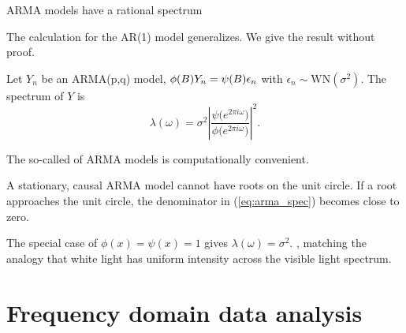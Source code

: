 \begin{frame}{ARMA models have a rational spectrum}
\bi
\item The calculation for the AR(1) model generalizes. We give the result without proof.
\item Let $Y_n$ be an ARMA(p,q) model, $\phi(B)Y_n = \psi(B)\epsilon_n$ with $\epsilon_n\sim \mathrm{WN}(\sigma^2)$. The spectrum of $Y$ is
\begin{equation} \label{eq:arma_spec}
\lambda(\omega) = \sigma^2 \left| \frac{\psi\big( e^{2\pi i \omega} \big)}{\phi\big( e^{2\pi i \omega} \big)} \right|^2.
\end{equation}
\item The so-called  of ARMA models is computationally convenient.
\item A stationary, causal ARMA model cannot have roots on the unit circle. If a root approaches the unit circle, the denominator in (\ref{eq:arma_spec}) becomes close to zero.
\item The special case of $\phi(x)=\psi(x)=1$ gives $\lambda(\omega)=\sigma^2$. , matching the analogy that white light has uniform intensity across the visible light spectrum.

\ei

\end{frame}

\section{Frequency domain data analysis}

